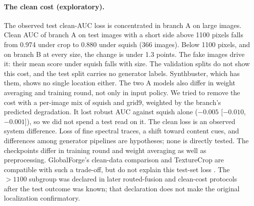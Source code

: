 \documentclass[letterpaper]{article} %
\begin{document}
\paragraph{The clean cost (exploratory).} The observed test clean-AUC loss is concentrated
in branch A on large images.
Clean AUC of branch A on test images with a short side above 1100 pixels
falls from 0.974 under crop to 0.880 under squish (366 images). Below 1100
pixels, and on branch B at every size, the change is under 1.3 points. The
fake images drive it: their mean score under squish falls with size. The
validation splits do not show this cost, and the test split carries no
generator labels. Synthbuster, which has them, shows no single location
either. The two A models also differ in weight averaging and training round,
not only in input policy. We tried to remove the cost with a per-image mix of
squish and grid9, weighted by the branch's predicted degradation. It lost
robust AUC against squish alone ($-0.005$ [$-0.010$, $-0.001$]), so we did
not spend a test read on it. The clean loss is an observed system difference. Loss of fine spectral traces, a shift toward content cues, and differences among generator pipelines are hypotheses; none is directly tested. The checkpoints differ in training round and weight averaging as well as preprocessing. GlobalForge's clean-data comparison and TextureCrop are compatible with such a trade-off, but do not explain this test-set loss \cite{cui2026globalforge,konstantinidou2025texturecrop}. The $>1100$ subgroup was declared in later routed-fusion and clean-cost protocols after the test outcome was known; that declaration does not make the original localization confirmatory.
\end{document}
